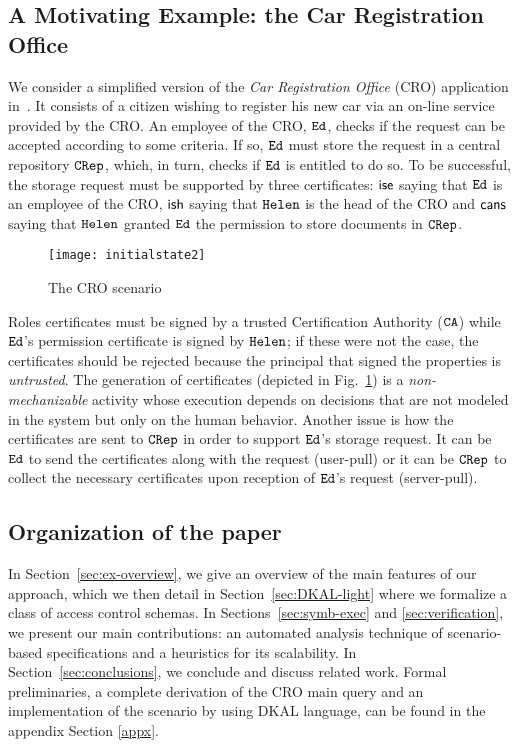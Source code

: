 \documentclass[conference]{llncs}
\newcommand{\theCA}{\ensuremath \mathtt{CA}}
\newcommand{\Ed}{\ensuremath \mathtt{Ed}}
\newcommand{\Helen}{\ensuremath \mathtt{Helen}}
\newcommand{\CRep}{\ensuremath \mathtt{CRep}}
\newcommand{\canstoredoc}{\ensuremath \mathsf{cans}}
\newcommand{\ishead}{\ensuremath \mathsf{ish}}
\newcommand{\isemployee}{\ensuremath \mathsf{ise}}
\newcommand{\CRO}{CRO}
\begin{document}
\subsection{A Motivating Example: the Car Registration Office} 
\label{sec:runningexe}

We consider a simplified version of the
\emph{Car Registration Office} (\CRO{}) application in~\cite{BRV-TR09}.
It consists of a citizen wishing
to register his new car via an on-line service provided by the \CRO{}.  
An employee of the \CRO{}, $\Ed$, checks if the request can be accepted according to
some criteria. If so, $\Ed$ must store the request in a central
repository $\CRep$, which, in turn,
checks if $\Ed$ is entitled to do so. 
To be successful, the storage request must be supported by three certificates: $\isemployee$ saying
that $\Ed$ is an employee of the \CRO{}, $\ishead$ saying that $\Helen$ is the head of the \CRO{} and $\canstoredoc$ saying that $\Helen$ granted $\Ed$ the permission to store documents
in $\CRep$. 
\begin{figure}[t]
\centering
  \texttt{[image: initialstate2]}
  \caption{\label{fig:1}The \CRO{} scenario} 
\end{figure}
Roles certificates must be signed by a
trusted Certification Authority ($\theCA$) while $\Ed$'s
permission certificate is signed by $\Helen$; if these were not the case, the
certificates should be rejected because the principal that signed the
properties is \emph{untrusted}. The generation of certificates
(depicted in Fig.~\ref{fig:1}) is a \emph{non-mechanizable} activity
whose execution depends on decisions that are not modeled in the
system but only on the human behavior.  Another issue is how the
certificates are sent to $\CRep$ in order to support $\Ed$'s storage
request.  It can be $\Ed$ to send the certificates along with the
request (user-pull) or it can be $\CRep$ to collect the necessary
certificates upon reception of $\Ed$'s request (server-pull).

\subsection*{Organization of the paper} 
In Section~\ref{sec:ex-overview}, we give an
overview of the main features of our approach, which we then detail in
Section~\ref{sec:DKAL-light} where we
formalize a class of access control schemas.  In Sections~\ref{sec:symb-exec} and \ref{sec:verification}, we present our main contributions: an automated analysis technique of scenario-based specifications and a heuristics for its scalability.
In Section~\ref{sec:conclusions}, we conclude and discuss related  work.
Formal preliminaries, a complete derivation of the \CRO{} main query and an implementation of the scenario by using DKAL language, can be found in the appendix Section \ref{appx}.
\end{document}
